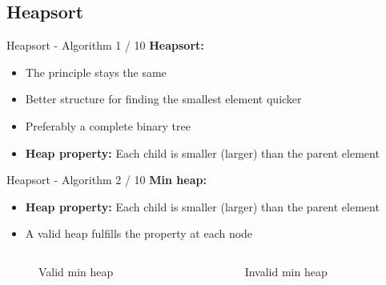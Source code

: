 \subsection{Heapsort}

\begin{frame}{Heapsort - Algorithm 1 / 10}
  \textbf{Heapsort:}
  \begin{itemize}
    \item
      The principle stays the same
    \item
      Better structure for finding the smallest element quicker
  \end{itemize}
  \vspace{1em}
  \begin{itemize}
    \item<2- |handout:1>
      Preferably a complete binary tree
    \item<2- |handout:1>
      \textbf{Heap property:} Each child is {\color{MainA}smaller} (larger) than the parent
      element
  \end{itemize}
\end{frame}


\begin{frame}{Heapsort - Algorithm 2 / 10}
  \textbf{Min heap:}
  \begin{itemize}
    \item<1- |handout:1>
      \textbf{Heap property:} Each child is {\color{MainA}smaller}
      (larger) than the parent element
  \item<2- |handout:1>
    A valid heap fulfills the property at each node
  \end{itemize}
  \vspace{-1em}
  \begin{columns}%
    \begin{column}[b]{0.45\textwidth}%
      \begin{figure}[!h]%
        \begin{adjustbox}{height=0.75\linewidth}%
          
        \end{adjustbox}
        \caption{Valid min heap}
        \label{fig:minheap_valid}
      \end{figure}
    \end{column}%
    \hspace*{0.1em}%
    \begin{column}[b]{0.45\textwidth}%
      \begin{figure}[!h]%
        \begin{adjustbox}{height=0.75\linewidth}%
          
        \end{adjustbox}
        \caption{Invalid min heap}
        \label{fig:minheap_invalid}
      \end{figure}
    \end{column}
  \end{columns}
\end{frame}


